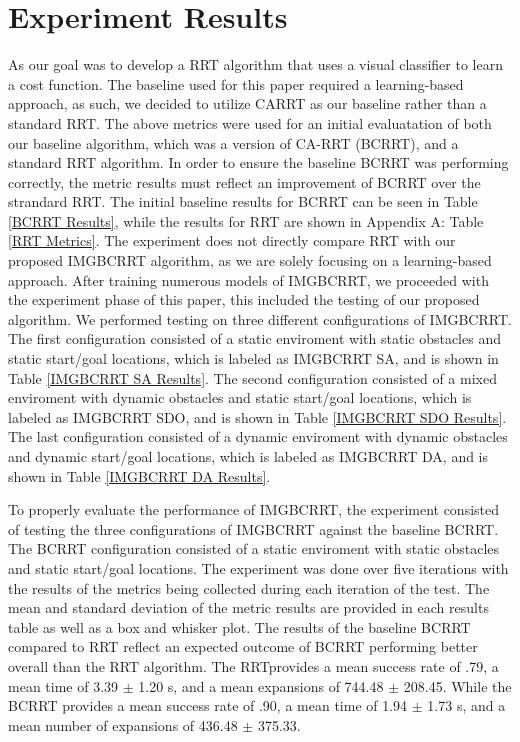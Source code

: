 \documentclass{article}
\begin{document}
\section{Experiment Results}
As our goal was to develop a RRT algorithm that uses a visual classifier to learn a cost function. The baseline used for this paper required a learning-based approach, as such, we decided to utilize CARRT as our baseline rather than a standard RRT. The above metrics were used for an initial evaluatation of both our baseline algorithm, which was a version of CA-RRT (BCRRT), and a standard RRT algorithm. In order to ensure the baseline BCRRT was performing correctly, the metric results must reflect an improvement of BCRRT over the strandard RRT. The initial baseline results for BCRRT can be seen in Table \ref{BCRRT Results}, while the results for RRT are shown in Appendix A: Table \ref{RRT Metrics}. The experiment does not directly compare RRT with our proposed IMGBCRRT algorithm, as we are solely focusing on a learning-based approach. After training numerous models of IMGBCRRT, we proceeded with the experiment phase of this paper, this included the testing of our proposed algorithm. We performed testing on three different configurations of IMGBCRRT. The first configuration consisted of a static enviroment with static obstacles and static start/goal locations, which is labeled as IMGBCRRT SA, and is shown in Table \ref{IMGBCRRT SA Results}. The second configuration consisted of a mixed enviroment with dynamic obstacles and static start/goal locations, which is labeled as IMGBCRRT SDO, and is shown in Table \ref{IMGBCRRT SDO Results}. The last configuration consisted of a dynamic enviroment with dynamic obstacles and dynamic start/goal locations, which is labeled as IMGBCRRT DA, and is shown in Table \ref{IMGBCRRT DA Results}. 

To properly evaluate the performance of IMGBCRRT, the experiment consisted of testing the three configurations of IMGBCRRT against the baseline BCRRT. The BCRRT configuration consisted of a static enviroment with static obstacles and static start/goal locations. The experiment was done over five iterations with the results of the metrics being collected during each iteration of the test. The mean and standard deviation of the metric results are provided in each results table as well as a box and whisker plot. The results of the baseline BCRRT compared to RRT reflect an expected outcome of  BCRRT performing better overall than the RRT algorithm. The RRTprovides a mean success rate of .79, a mean time of 3.39 $\pm$ 1.20 s, and a mean expansions of 744.48 $\pm$ 208.45. While the BCRRT provides a mean success rate of .90, a mean time of 1.94 $\pm$ 1.73 s, and a mean number of expansions of 436.48 $\pm$ 375.33.
\end{document}
